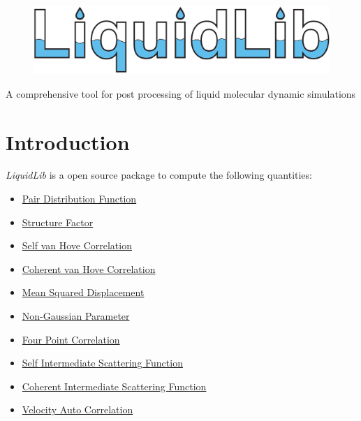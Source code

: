 \documentclass{article}
\begin{document}
	\begin{figure}
		\centering
		\includegraphics[width=.9\textwidth]{./images/LiquidLib_logo.pdf}
	\end{figure}
{
\centering
\Large A comprehensive tool for post processing of liquid molecular dynamic simulations
}
\newpage

\section{Introduction}
\textit{LiquidLib} is a open source package to compute the following quantities:
\begin{itemize}
	\item \hyperref[sec::gofr]{Pair Distribution Function}
	\item \hyperref[sec::sofk]{Structure Factor}
	\item \hyperref[sec::Gofrt]{Self van Hove Correlation}
	\item \hyperref[sec::Grt]{Coherent van Hove Correlation}
	\item \hyperref[sec::MSD]{Mean Squared Displacement}
	\item \hyperref[sec::alpha2]{Non-Gaussian Parameter}
	\item \hyperref[sec::chi4]{Four Point Correlation}
	\item \hyperref[sec::Fsqt]{Self Intermediate Scattering Function}
	\item \hyperref[sec::Fqt]{Coherent Intermediate Scattering Function}
	\item \hyperref[sec::VACF]{Velocity Auto Correlation}
\end{itemize}
\end{document}
